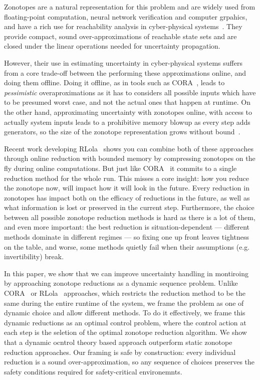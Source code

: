 \documentclass[letterpaper, 10 pt, conference]{ieeeconf}  %
\begin{document}
Zonotopes are a natural representation for this problem  and are widely used from floating-point computation, neural network verification and computer grpahics, and have a rich use for reachability analysis in cyber-physical systems~\cite{Althoff2015ARCH,Wetzlinger2024diss}. They provide compact, sound over-approximations of reachable state sets and are closed under the linear operations needed for uncertainty propagation. 

However, their use in estimating uncertainty in cyber-physical systems suffers from a core trade-off between the performing these approximations online, and doing them offline.  Doing it offline, as in tools such as CORA~\cite{Althoff2015ARCH}, leads to \textit{pessimistic} overaproximations as it has to considers all  possible inputs which have to be presumed worst case, and not the actual ones that happen at runtime. On the other hand, approximating uncertainty with zonotopes online, with access to actually system inputs leads to a prohibitive memory blowup as every step adds generators, so the size of the zonotope representation grows without bound~\cite{DBLP:conf/rv/FinkbeinerFKK24}.


Recent work developing RLola~\cite{DBLP:journals/corr/cuttingcorners} shows you can combine both of these approaches through online reduction with bounded memory by compressing zonotopes on the fly during online computations. But just like CORA~\cite{Althoff2015ARCH} it commits to a single reduction method for the whole run. This misses a core insight: how you reduce the zonotope now, will impact how it will look in the future. Every reduction in zonotopes has impact both on the efficacy of reductions in the future, as well as what information is lost or preserved in the current step. Furthermore, the choice between all possible zonotope reduction methods is hard as there is a lot of them, and even more important: the best reduction is situation-dependent — different methods dominate in different regimes — so fixing one up front leaves tightness on the table, and worse, some methods quietly fail when their assumptions (e.g. invertibility) break.

In this paper, we show that we can improve uncertainty handling in montiroing by approaching zonotope reductions as a dynamic sequence problem. Unlike CORA~\cite{Althoff2015ARCH} or RLola~\cite{DBLP:journals/corr/cuttingcorners} approaches, which restricts the reduction method to be the same during the entire runtime of the system, we frame the problem as one of dynamic choice and allow different methods. To do it effectively, we frame this dynamic reductions as an optimal control problem, where the control action at each step is the seletion of the optimal zonotope reduction algorithm. We show that a dynamic ocntrol theory based approach outperform static zonotope reduction approaches.  Our framing is safe by construction: every individual reduction is a sound over-approximation, so any sequence of choices preserves the safety conditions required for safety-critical environemnts. 
\end{document}
